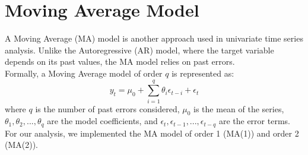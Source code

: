 \section{Moving Average Model}
\label{sec:MA}
A Moving Average (MA) model is another approach used in univariate time series analysis. Unlike the Autoregressive (AR) model, where the target variable depends on its past values, the MA model relies on past errors. \\
Formally, a Moving Average model of order $q$ is represented as:
\begin{equation}
    \label{eq:MA}
    y_{t} = \mu_{0} + \sum^{q}_{i=1} \theta_{i} \epsilon_{t-i} + \epsilon_t
\end{equation}
where $q$ is the number of past errors considered, $\mu_{0}$ is the mean of the series, $\theta_{1}, \theta_{2}, ..., \theta_{q}$ are the model coefficients, and $\epsilon_{t}, \epsilon_{t-1}, ..., \epsilon_{t-q}$ are the error terms. \\
For our analysis, we implemented the MA model of order 1 (MA(1)) and order 2 (MA(2)).

